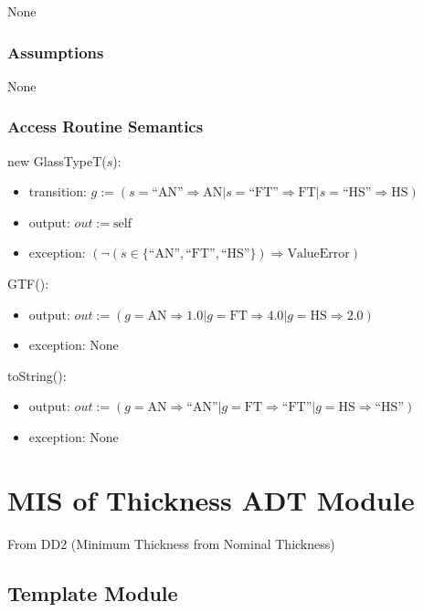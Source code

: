 \documentclass[12pt, titlepage]{article}
\begin{document}
None

\subsubsection {Assumptions}

None

\subsubsection {Access Routine Semantics}

\noindent new GlassTypeT($s$):
\begin{itemize}
\item transition: $g := (s = \mbox{``AN''} \Rightarrow \mbox{AN} | s =
  \mbox{``FT''} \Rightarrow \mbox{FT} | s = \mbox{``HS''} \Rightarrow \mbox{HS})$
\item output: $out := \mbox{self}$
\item exception: $(\neg (s \in \{ \mbox{``AN''}, \mbox{``FT''}, \mbox{``HS''} \}) \Rightarrow \mbox{ValueError})$
\end{itemize}

\noindent GTF():
\begin{itemize}
\item output: $out := ( g = \mbox{AN} \Rightarrow 1.0 | g =
  \mbox{FT} \Rightarrow 4.0 | g = \mbox{HS} \Rightarrow 2.0)$
\item exception: None
\end{itemize}

\noindent toString():
\begin{itemize}
\item output: $out := (g = \mbox{AN} \Rightarrow \mbox{``AN''} | g =
  \mbox{FT} \Rightarrow \mbox{``FT''} | g = \mbox{HS} \Rightarrow \mbox{``HS''})$
\item exception: None
\end{itemize}

\newpage


\section {MIS of Thickness ADT Module} \label{ThicknessADT}

From DD2 (Minimum Thickness from Nominal Thickness) %

\subsection{Template Module}
\end{document}
